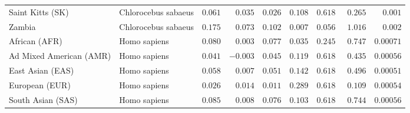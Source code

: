 \begin{center}
\begin{adjustbox}{width = 1\textwidth}
\begin{tabular}{|l|l|r|r|r|r|r|r|r|}
            Saint Kitts (SK)                  & Chlorocebus sabaeus        & $ 0.061$ & $ 0.035$ & $ 0.026$ & $ 0.108$ & $ 0.618~~$        & $ 0.265$ & $ 0.001$ \\
            Zambia        & Chlorocebus sabaeus        & $ 0.175$ & $ 0.073$ & $ 0.102$ & $ 0.007$ & $ 0.056~~$ & $ 1.016$ & $ 0.002$ \\
            African (AFR)               & Homo sapiens        & $ 0.080$ & $ 0.003$ & $ 0.077$ & $ 0.035$ & $ 0.245~~$        & $ 0.747$ & $0.00071$ \\
            Ad Mixed American (AMR)                 & Homo sapiens        & $ 0.041$ & $-0.003$ & $ 0.045$ & $ 0.119$ & $ 0.618~~$        & $ 0.435$ & $0.00056$ \\
            East Asian (EAS)              & Homo sapiens        & $ 0.058$ & $ 0.007$ & $ 0.051$ & $ 0.142$ & $ 0.618~~$        & $ 0.496$ & $0.00051$ \\
            European (EUR)              & Homo sapiens        & $ 0.026$ & $ 0.014$ & $ 0.011$ & $ 0.289$ & $ 0.618~~$        & $ 0.109$ & $0.00054$ \\
            South Asian (SAS)              & Homo sapiens        & $ 0.085$ & $ 0.008$ & $ 0.076$ & $ 0.103$ & $ 0.618~~$        & $ 0.744$ & $0.00056$ \\
            \bottomrule
        \end{tabular}
    \end{adjustbox}
    \newpage
\end{center}

